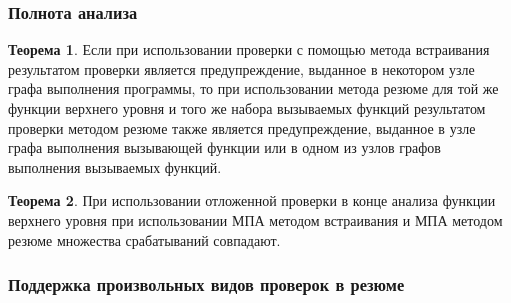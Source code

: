 \documentclass[hyperref={pdfpagelabels=false}]{beamer}
\begin{document}

\begin{frame}
\frametitle{Полнота анализа}
\textbf{Теорема 1}. Если при использовании проверки с помощью метода встраивания результатом проверки является предупреждение, выданное в некотором узле графа выполнения программы, то при использовании метода резюме для той же функции верхнего уровня и того же набора вызываемых функций результатом проверки методом резюме также является предупреждение, выданное в узле графа выполнения вызывающей функции или в одном из узлов графов выполнения вызываемых функций.

\textbf{Теорема 2}. При использовании отложенной проверки в конце анализа функции верхнего уровня при использовании МПА методом встраивания и МПА методом резюме множества срабатываний совпадают.
\end{frame}

\begin{frame}
\frametitle{Поддержка произвольных видов проверок в резюме}
\begin{figure}[h]
\end{figure}
\end{frame}
\end{document}
